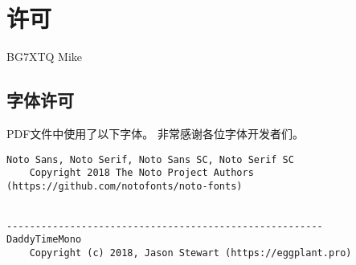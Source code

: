\chapter*{许可}

\noindent {} BG7XTQ Mike

\section*{字体许可}

\noindent PDF文件中使用了以下字体。
非常感谢各位字体开发者们。

\begin{lstlisting}[numbers=none]
Noto Sans, Noto Serif, Noto Sans SC, Noto Serif SC
    Copyright 2018 The Noto Project Authors (https://github.com/notofonts/noto-fonts)


-------------------------------------------------------
DaddyTimeMono
    Copyright (c) 2018, Jason Stewart (https://eggplant.pro)
\end{lstlisting}
